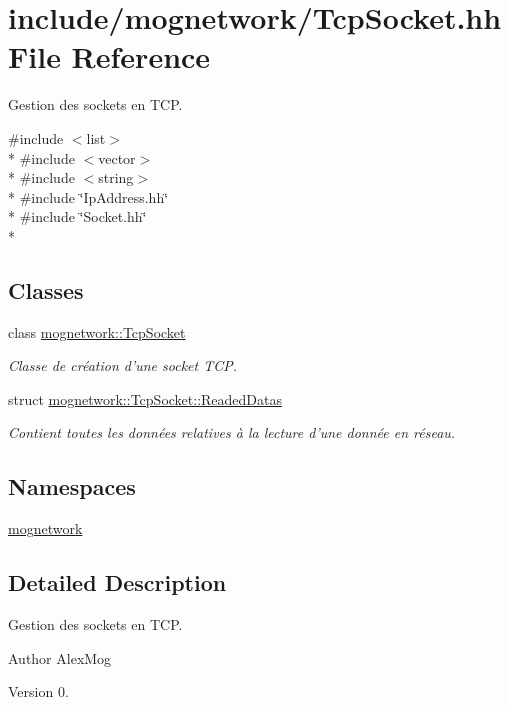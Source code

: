 \hypertarget{_tcp_socket_8hh}{\section{include/mognetwork/\-Tcp\-Socket.hh File Reference}
\label{_tcp_socket_8hh}
}


Gestion des sockets en T\-C\-P.  


{\ttfamily \#include $<$list$>$}\\*
{\ttfamily \#include $<$vector$>$}\\*
{\ttfamily \#include $<$string$>$}\\*
{\ttfamily \#include \char`\"{}Ip\-Address.\-hh\char`\"{}}\\*
{\ttfamily \#include \char`\"{}Socket.\-hh\char`\"{}}\\*
\subsection*{Classes}
\begin{DoxyCompactItemize}
\item 
class \hyperlink{classmognetwork_1_1_tcp_socket}{mognetwork\-::\-Tcp\-Socket}
\begin{DoxyCompactList}\small\item\em Classe de création d'une socket T\-C\-P. \end{DoxyCompactList}\item 
struct \hyperlink{structmognetwork_1_1_tcp_socket_1_1_readed_datas}{mognetwork\-::\-Tcp\-Socket\-::\-Readed\-Datas}
\begin{DoxyCompactList}\small\item\em Contient toutes les données relatives à la lecture d'une donnée en réseau. \end{DoxyCompactList}\end{DoxyCompactItemize}
\subsection*{Namespaces}
\begin{DoxyCompactItemize}
\item 
\hyperlink{namespacemognetwork}{mognetwork}
\end{DoxyCompactItemize}


\subsection{Detailed Description}
Gestion des sockets en T\-C\-P. \begin{DoxyAuthor}{Author}
Alex\-Mog 
\end{DoxyAuthor}
\begin{DoxyVersion}{Version}
0. 
\end{DoxyVersion}
